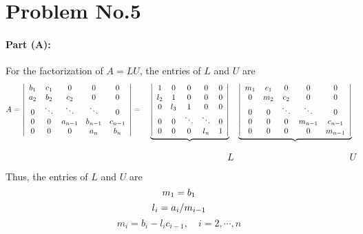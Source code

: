 \section*{Problem No.5} \label{sec:prob5}

\paragraph{Part (A):} For the factorization of $A = LU$, the entries of $L$ and $U$ are 
\[
A =
\left| 
\begin{array}{cc cc c}
b_{1} &  c_{1}  &  0     &  0     &   0      \\
a_{2} &  b_{2}  &  c_{2} &  0     &   0      \\
 0    &  \ddots & \ddots & \ddots &   0      \\
 0    &  0      & a_{n-1}& b_{n-1}&   c_{n-1}\\ 
 0    &  0      & 0      & a_{n}  &   b_{n}  \\ 
\end{array} 
\right| = \quad 
\underbrace{
\left| 
\begin{array}{cc cc c}
1     &  0     &  0     &  0         &   0 \\
l_{2} &  1     &  0     &  0         &   0 \\
 0    &  l_{3} & 1      &  0         &   0 \\
 0    &  0     & \ddots & \ddots &   0 \\ 
 0    &  0     & 0      & l_{n}  &   1 \\ 
\end{array} 
\right|}_\text{} \quad
\underbrace{
\left| 
\begin{array}{cc cc c}
m_{1} & c_{1}  &  0      &  0       &   0      \\
0     & m_{2}  &  c_{2}  &  0       &   0      \\
0     & 0      &  \ddots &  \ddots  &   0      \\
0     & 0      &  0      &  m_{n-1} &  c_{n-1} \\
0     & 0      &  0      &  0       &  m_{n-1} \\
\end{array} 
\right|}_\text{}
\] 
$\qquad \qquad \qquad \qquad \qquad \qquad \qquad \qquad \qquad \qquad \qquad \quad L \qquad \qquad \qquad \qquad \qquad \qquad  U$

Thus, the entries of $L$ and $U$ are
\[
m_{1} = b_{1}\\
\]
\[
l_{i} = a_{i}/m_{i-1}\\
\]
\[
m_{i} = b_{i} - l_{i}c_{i-1}, \quad i=2, \cdots, n
\]

